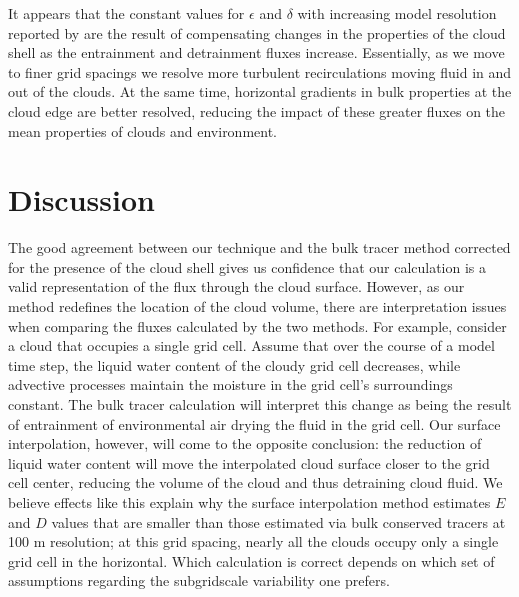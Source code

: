\documentclass[12pt]{article}
\begin{document}
It appears that the constant values for $\epsilon$ and $\delta$ with increasing
model resolution reported by \cite{Brown1999} are the result of compensating
changes in the properties of the cloud shell as the entrainment and detrainment
fluxes increase.  Essentially, as we move to finer grid spacings we resolve
more turbulent recirculations moving fluid in and out of the clouds.  At the
same time, horizontal gradients in bulk properties at the cloud edge are better
resolved, reducing the impact of these greater fluxes on the mean properties of 
clouds and environment.


\section{Discussion}

The good agreement between our technique and the bulk tracer method corrected 
for the presence of the cloud shell gives us confidence that our calculation is 
a valid representation of the flux through the cloud surface.  However, as our 
method redefines the location of the cloud volume, there are interpretation 
issues when comparing the fluxes calculated by the two methods.  For example, 
consider a cloud that occupies a single grid cell.  Assume that over the course 
of a model time step, the liquid water content of the cloudy grid cell 
decreases, while advective processes maintain the moisture in the grid cell's 
surroundings constant.  The bulk tracer calculation will interpret this change 
as being the result of entrainment of environmental air drying the fluid in the 
grid cell.  Our surface interpolation, however, will come to the opposite 
conclusion: the reduction of liquid water content will move the interpolated 
cloud surface closer to the grid cell center, reducing the volume of the cloud 
and thus detraining cloud fluid.  We believe effects like this explain why the 
surface interpolation method estimates $E$ and $D$ values that are smaller than 
those estimated via bulk conserved tracers at 100 m resolution; at this grid 
spacing, nearly all the clouds occupy only a single grid cell in the horizontal.
Which calculation is correct depends on which set of assumptions regarding the 
subgridscale variability one prefers.  
\end{document}
